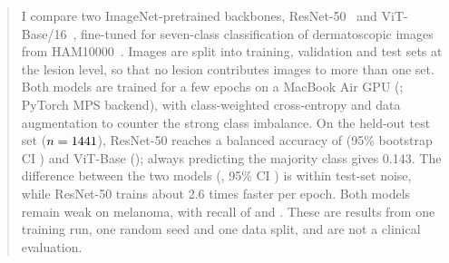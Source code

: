 \begin{abstract}
I compare two ImageNet-pretrained backbones, ResNet-50~\cite{he2016deep} and ViT-Base/16~\cite{dosovitskiy2021image}, fine-tuned for seven-class classification of dermatoscopic images from HAM10000~\cite{tschandl2018ham10000}.
Images are split into training, validation and test sets at the lesion level, so that no lesion contributes images to more than one set.
Both models are trained for a few epochs on a MacBook Air GPU (\hardware; PyTorch MPS backend), with class-weighted cross-entropy and data augmentation to counter the strong class imbalance.
On the held-out test set ($n=\nTest$), ResNet-50 reaches a balanced accuracy of \resnetTestBacc{} (95\% bootstrap CI \resnetTestBaccCI) and ViT-Base \vitTestBacc{} (\vitTestBaccCI); always predicting the majority class gives 0.143.
The difference between the two models (\baccDiff{}, 95\% CI \baccDiffCI) is within test-set noise, while ResNet-50 trains about 2.6 times faster per epoch.
Both models remain weak on melanoma, with recall of \resnetMelRecall{} and \vitMelRecall{}.
These are results from one training run, one random seed and one data split, and are not a clinical evaluation.
\end{abstract}

